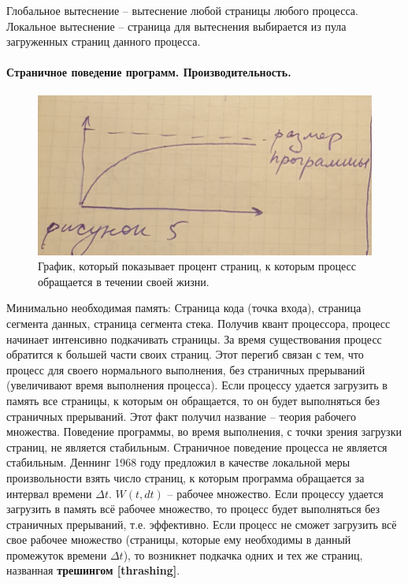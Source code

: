 Глобальное вытеснение – вытеснение любой страницы любого процесса. Локальное вытеснение – страница для вытеснения выбирается из пула загруженных страниц данного процесса. 

\paragraph{Страничное поведение программ. Производительность.}

\begin{figure}[H]
    \centering
    \includegraphics[width=\textwidth]{pic/12.png}
    \caption{График, который показывает процент страниц, к которым процесс обращается в течении своей жизни.}
\end{figure}

Минимально необходимая память: Страница кода (точка входа), страница сегмента данных, страница сегмента стека. Получив квант процессора, процесс начинает интенсивно подкачивать страницы. За время существования процесс обратится к большей части своих страниц. Этот перегиб связан с тем, что процесс для своего нормального выполнения, без страничных прерываний (увеличивают время выполнения процесса). Если процессу удается загрузить в память все страницы, к которым он обращается, то он будет выполняться без страничных прерываний. Этот факт получил название – теория рабочего множества. Поведение программы, во время выполнения, с точки зрения загрузки страниц, не является стабильным. Страничное поведение процесса не является стабильным. 
Деннинг 1968 году предложил в качестве локальной меры произвольности взять число страниц, к которым программа обращается за интервал времени $\Delta t$. $W(t, dt)$ – рабочее множество. Если процессу удается загрузить в память всё рабочее множество, то процесс будет выполняться без страничных прерываний, т.е. эффективно. Если процесс не сможет загрузить всё свое рабочее множество (страницы, которые ему необходимы в данный промежуток времени $\Delta t$), то возникнет подкачка одних и тех же страниц, названная \textbf{трешингом [thrashing]}.

